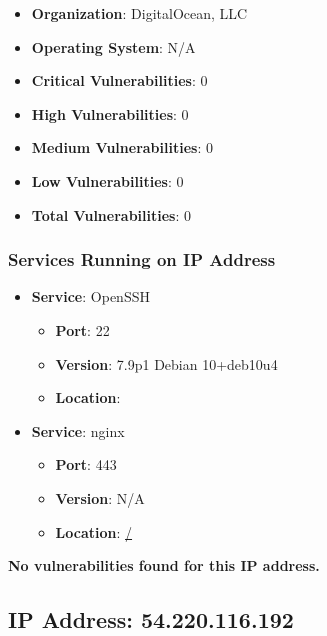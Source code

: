 \documentclass{article}
\begin{document}
\begin{itemize}
    \item \textbf{Organization}: DigitalOcean, LLC
    \item \textbf{Operating System}:  N/A 
    \item \textbf{Critical Vulnerabilities}: 0
    \item \textbf{High Vulnerabilities}: 0
    \item \textbf{Medium Vulnerabilities}: 0
    \item \textbf{Low Vulnerabilities}: 0
    \item \textbf{Total Vulnerabilities}: 0
\end{itemize}

\subsubsection*{Services Running on IP Address}

\begin{itemize}
    
        \item \textbf{Service}: OpenSSH
        \begin{itemize}
            \item \textbf{Port}: 22
            \item \textbf{Version}:  7.9p1 Debian 10+deb10u4 
            \item \textbf{Location}: \href{  }{  }
        \end{itemize}
    
        \item \textbf{Service}: nginx
        \begin{itemize}
            \item \textbf{Port}: 443
            \item \textbf{Version}:  N/A 
            \item \textbf{Location}: \href{ / }{ / }
        \end{itemize}
    
\end{itemize}


\textbf{No vulnerabilities found for this IP address.}




\clearpage



\subsection{IP Address: 54.220.116.192}
\end{document}
